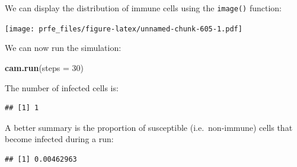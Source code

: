 \documentclass[12pt,a4paper]{book}
\newenvironment{Shaded}{\begin{snugshade}}{\end{snugshade}}
\newcommand{\DataTypeTok}[1]{\textcolor[rgb]{0.13,0.29,0.53}{#1}}
\newcommand{\DecValTok}[1]{\textcolor[rgb]{0.00,0.00,0.81}{#1}}
\newcommand{\KeywordTok}[1]{\textcolor[rgb]{0.13,0.29,0.53}{\textbf{#1}}}
\newcommand{\NormalTok}[1]{#1}
\newcommand{\OperatorTok}[1]{\textcolor[rgb]{0.81,0.36,0.00}{\textbf{#1}}}
\newcommand{\OtherTok}[1]{\textcolor[rgb]{0.56,0.35,0.01}{#1}}
\newcommand{\StringTok}[1]{\textcolor[rgb]{0.31,0.60,0.02}{#1}}
\theoremstyle{definition}
\theoremstyle{definition}
\theoremstyle{definition}
\theoremstyle{remark}
\begin{document}
We can display the distribution of immune cells using the
\texttt{image()} function:

\begin{Shaded}
\end{Shaded}

\texttt{[image: prfe\_files/figure-latex/unnamed-chunk-605-1.pdf]}

We can now run the simulation:

\begin{Shaded}
\begin{Highlighting}[]
\KeywordTok{cam.run}\NormalTok{(}\DataTypeTok{steps =} \DecValTok{30}\NormalTok{)}
\end{Highlighting}
\end{Shaded}

The number of infected cells is:

\begin{Shaded}
\end{Shaded}

\begin{verbatim}
## [1] 1
\end{verbatim}

A better summary is the proportion of susceptible (i.e.~non-immune)
cells that become infected during a run:

\begin{Shaded}
\end{Shaded}

\begin{verbatim}
## [1] 0.00462963
\end{verbatim}
\end{document}
